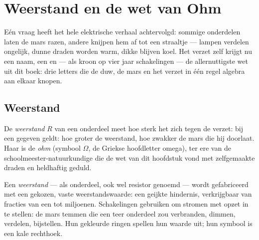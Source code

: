\chapter{Weerstand en de wet van Ohm}\label{ch:g8:ohms-law}

Eén vraag heeft het hele elektrische verhaal achtervolgd: sommige
onderdelen laten de mars razen, andere knijpen hem af tot een straaltje
--- lampen verdelen  ongelijk, dunne draden worden warm,
dikke blijven koel. Het verzet zelf krijgt nu een naam, een
 en --- als kroon op vier jaar schakelingen --- de
allernuttigste wet uit dit boek: drie letters die de duw, de mars en
het verzet in één regel algebra aan elkaar knopen.

\section{Weerstand}

\begin{definition}[Weerstand]\label{def:g8:ohms-law:resistance}
De \emph{weerstand} $R$ van een onderdeel
meet hoe sterk het zich tegen de
 verzet: bij een gegeven
 geldt: hoe groter de weerstand, hoe zwakker de mars
die hij doorlaat. Haar  is de \emph{ohm}
(symbool $\Omega$, de Griekse hoofdletter omega), ter ere van de
schoolmeester-natuurkundige die de wet van dit hoofdstuk vond met
zelfgemaakte draden en heldhaftig geduld.
\end{definition}

\begin{definition}\label{def:g8:ohms-law:resistor}
Een \emph{weerstand} --- als onderdeel, ook wel
resistor genoemd --- wordt gefabriceerd met een gekozen, vaste
weerstandswaarde: een geijkte hindernis, verkrijgbaar van
fracties van een  tot miljoenen. Schakelingen gebruiken
 om stromen met opzet in te stellen: de mars temmen die een
teer onderdeel zou verbranden, dimmen, verdelen, bijstellen. Hun
gekleurde ringen spellen hun waarde uit; hun symbool is een kale
rechthoek.
\end{definition}

